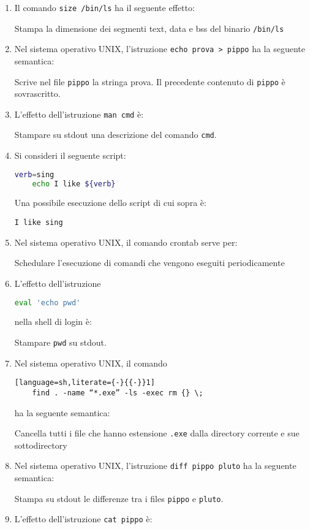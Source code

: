 \documentclass[a4paper,twoside]{article}
\newcommand{\code}[1]{\texttt{#1}}
\begin{document}
\begin{enumerate}
    \item Il comando \code{size /bin/ls} ha il seguente effetto:

    Stampa la dimensione dei segmenti text, data e bss del binario \code{/bin/ls}
    \item Nel sistema operativo UNIX, l'istruzione \code{echo prova > pippo} ha la seguente semantica: 

    Scrive nel file \code{pippo} la stringa prova. Il precedente contenuto di \code{pippo} \`e sovrascritto. 
    \item L'effetto dell'istruzione \code{man cmd} \`e:

    Stampare su stdout una descrizione del comando \code{cmd}.
    \item Si consideri il seguente script:
    \begin{lstlisting}[language=sh]
    verb=sing
    echo I like ${verb}
    \end{lstlisting}
    Una possibile esecuzione dello script di cui sopra \`e: 

    \code{I like sing} 
    \item Nel sistema operativo UNIX, il comando crontab serve per:

    Schedulare l'esecuzione di comandi che vengono eseguiti periodicamente

    \item L'effetto dell'istruzione 
    \begin{lstlisting}[language=sh]
    eval 'echo pwd'
    \end{lstlisting}
    nella shell di login \`e: 

    Stampare \code{pwd} su stdout. 
    \item Nel sistema operativo UNIX, il comando 
    \begin{lstlisting}[language=sh,literate={-}{{-}}1]
    find . -name “*.exe” -ls -exec rm {} \;
    \end{lstlisting}
    ha la seguente semantica:

    Cancella tutti i file che hanno estensione \code{.exe} dalla directory corrente e sue sottodirectory
    \item Nel sistema operativo UNIX, l'istruzione \code{diff pippo pluto} ha la seguente semantica: 

    Stampa su stdout le differenze tra i files \code{pippo} e \code{pluto}.
    \item L'effetto dell'istruzione \code{cat pippo} \`e: 


\end{enumerate}
\end{document}
